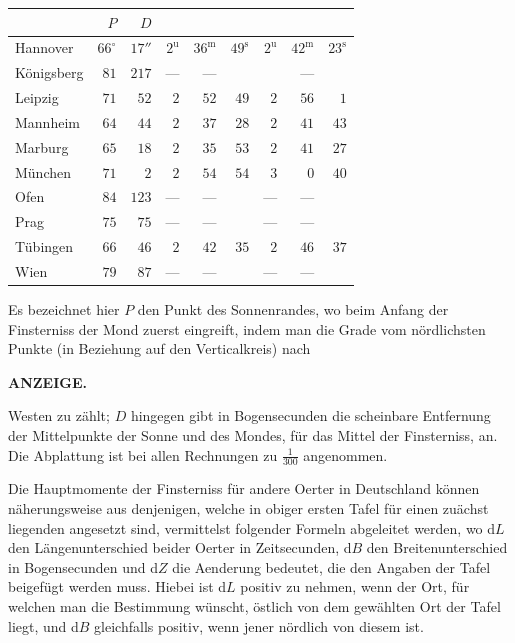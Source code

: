 \begin{center}\small\setlength{\tabcolsep}{3pt}
\begin{tabular}{l|r|r|rrr|rrr}
  &  $P$  &  $D$  &    &    \\
\hline
 Hannover  &  $66^\circ$  &  $17''$  &  $2^{\mathrm u}$  &  $36^{\mathrm m}$  &  $49^{\mathrm s}$  &  $2^{\mathrm u}$  &  $42^{\mathrm m}$  &  $23^{\mathrm s}$ \\
 Königsberg  &  $81$  &  $217$  &  ---  &  ---  &   &  & --- &  \\
 Leipzig  &  $71$  &  $52$  &  $2$  &  $52$  &  $49$  &  $2$  &  $56$  &  $1$ \\
 Mannheim  &  $64$  &  $44$  &  $2$  &  $37$  &  $28$  &  $2$  &  $41$  &  $43$ \\
 Marburg  &  $65$  &  $18$  &  $2$  &  $35$  &  $53$  &  $2$  &  $41$  &  $27$ \\
 München  &  $71$  &  $2$  &  $2$  &  $54$  &  $54$  &  $3$  &  $0$  &  $40$ \\
 Ofen  &  $84$  &  $123$  &  ---  &  ---  &   &  ---  &  ---  &  \\
 Prag  &  $75$  &  $75$  &  ---  &  ---  &   &  ---  &  ---  &  \\
 Tübingen  &  $66$  &  $46$  &  $2$  &  $42$  &  $35$  &  $2$  &  $46$  &  $37$ \\
 Wien  &  $79$  &  $87$  &  ---  &  ---  &   &  ---  &  ---  &  \\
\end{tabular}
\end{center}

Es bezeichnet hier $P$ den Punkt des Sonnenrandes, wo beim Anfang der Finsterniss der Mond zuerst eingreift, indem man die Grade vom nördlichsten Punkte (in Beziehung auf den Verticalkreis) nach\par
\clearpage
{}
\noindent{}%
\parbox[b]{\dimexpr\textwidth-20mm\relax}{\centering\small\textbf{ANZEIGE.}}%
\makebox[10mm][r]{}\par\nobreak\medskip
\noindent Westen zu zählt; $D$ hingegen gibt in Bogensecunden die scheinbare Entfernung der Mittelpunkte der Sonne und des Mondes, für das Mittel der Finsterniss, an. Die Abplattung ist bei allen Rechnungen zu $\tfrac{1}{300}$ angenommen.

Die Hauptmomente der Finsterniss für andere Oerter in Deutschland können näherungsweise aus denjenigen, welche in obiger ersten Tafel für einen zuächst liegenden angesetzt sind, vermittelst folgender Formeln abgeleitet werden, wo d$L$ den Längenunterschied beider Oerter in Zeitsecunden, d$B$ den Breitenunterschied in Bogensecunden und d$Z$ die Aenderung bedeutet, die den Angaben der Tafel beigefügt werden muss. Hiebei ist d$L$ positiv zu nehmen, wenn der Ort, für welchen man die Bestimmung wünscht, östlich von dem gewählten Ort der Tafel liegt, und d$B$ gleichfalls positiv, wenn jener nördlich von diesem ist.

